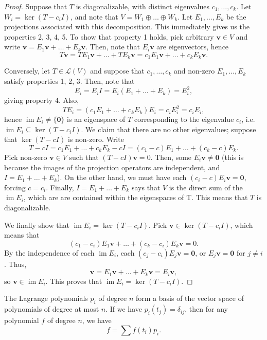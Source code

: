 \documentclass[11pt]{article}
\renewcommand{\vec}[1]{\boldsymbol{#1}}
\newcommand{\vv}{\vec{v}}
\newcommand{\alg}[1]{\mathscr{#1}}
\newcommand{\algL}{\alg{L}}
\renewcommand{\ker}{\operatorname{ker}}
\newcommand{\im}{\operatorname{im}}
\theoremstyle{definition}
\theoremstyle{remark}
\numberwithin{equation}{section}
\begin{document}
    \begin{proof}
        Suppose that $T$ is diagonalizable, with distinct eigenvalues $c_1, \dots,
        c_k$. Let $W_i = \ker(T - c_iI)$, and note that $V = W_1 \oplus \dots \oplus
        W_k$. Let $E_1, \dots, E_k$ be the projections associated with this
        decomposition. This immediately gives us the properties 2, 3, 4, 5. To show
        that property 1 holds, pick arbitrary $\vv \in V$ and write $\vv = E_1\vv +
        \dots + E_k\vv$. Then, note that $E_i\vv$ are eigenvectors, hence \[
            T\vv = TE_1\vv + \dots + TE_k\vv = c_1E_1\vv + \dots + c_kE_k\vv.
        \] 

        Conversely, let $T \in \algL(V)$ and suppose that $c_1, \dots, c_k$ and
        non-zero $E_1, \dots, E_k$ satisfy properties 1, 2, 3. Then, note that \[
            E_i = E_iI = E_i(E_1 + \dots + E_k) = E_i^2,
        \] giving property 4. Also, \[
            TE_i = (c_1E_1 + \dots + c_kE_k)E_i = c_iE_i^2 = c_iE_i,
        \] hence $\im{E_i} \neq \{\vec{0}\}$ is an eigenspace of $T$ corresponding to
        the eigenvalue $c_i$, i.e.\ $\im{E_i} \subseteq \ker(T - c_iI)$. We claim
        that there are no other eigenvalues; suppose that $\ker(T - cI)$ is non-zero.
        Write \[
            T - cI = c_1E_1 + \dots + c_kE_k - cI = (c_1 - c)E_1 + \dots + (c_k -
            c)E_k.
        \] Pick non-zero $\vv \in V$ such that $(T - cI)\vv = 0$. Then, some $E_i\vv
        \neq \vec{0}$ (this is because the images of the projection operators are
        independent, and $I = E_1 + \dots + E_k$). On the other hand, we must have
        each $(c_i - c)E_i\vv = \vec{0}$, forcing $c = c_i$. Finally, $I = E_1 +
        \dots + E_k$ says that $V$ is the direct sum of the $\im{E_i}$, which are
        are contained within the eigenspaces of T. This means that $T$ is
        diagonalizable.

        We finally show that $\im{E_i} = \ker(T - c_iI)$. Pick $\vv \in \ker(T -
        c_iI)$, which means that \[
            (c_1 - c_i)E_1\vv + \dots + (c_k - c_i)E_k\vv = 0.
        \] By the independence of each $\im{E_i}$, each $(c_j - c_i)E_j\vv =
        \vec{0}$, or $E_j\vv = \vec{0}$ for $j \neq i$. Thus, \[
            \vv = E_1\vv + \dots + E_k\vv = E_i\vv,
        \] so $\vv \in \im{E_i}$. This proves that $\im{E_i} = \ker(T - c_iI)$.
    \end{proof}

    \begin{lemma}
        The Lagrange polynomials $p_i$ of degree $n$ form a basis of the vector space
        of polynomials of degree at most $n$. If we have $p_i(t_j) = \delta_{ij}$,
        then for any polynomial $f$ of degree $n$, we have \[
            f = \sum f(t_i)p_i.
        \] 
    \end{lemma}
    
\end{document}
